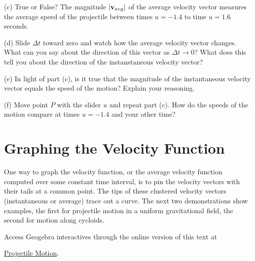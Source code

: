 \documentclass{ximera}
\begin{document}
\begin{exploration}
\begin{question}
(c) True or False? 
The magnitude $| {\bf v}_{avg} |$ of the average velocity vector measures the average speed of the projectile between times $u=-1.4$ to time $u=1.6$ seconds.
\begin{multipleChoice}  
\end{multipleChoice}  




(d) Slide $\Delta t$ toward zero and watch how the average velocity vector changes. What can you say about the direction of this vector as $\Delta t \to 0$? What does this tell you about the direction of the instanstaneous velocity vector? 

(e) In light of part (c), is it true that the magnitude of the instantaneous velocity vector equals the speed of the motion? Explain your reasoning.

(f) Move point $P$ with the slider $u$ and repeat part (c). How do the speeds of the motion compare at times $u=-1.4$ and your other time? 
\end{question}


 
\begin{onlineOnly}
    \begin{center}
\end{center}
\end{onlineOnly}


\section{Graphing the Velocity Function}
One way to graph the velocity function, or the average velocity function computed over some constant time interval, is to pin the velocity vectors with their tails at a common point. The tips of these clustered velocity vectors (instantaneous or average) trace out a curve. The next two demonstrations show examples, the first for projectile motion in a uniform gravitational field, the second for motion along cycloids.

Access Geogebra interactives through the online version of this text at
 
\href{https://www.geogebra.org/classic/egzphw3q}{Projectile Motion}.

\end{exploration}
\end{document}
